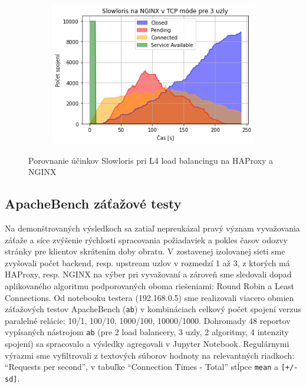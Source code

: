 \documentclass[12pt, a4paper]{article}
\begin{document}
\begin{figure}[h]
\begin{subfigure}[t]{.32\textwidth}
	\end{subfigure}
	\begin{subfigure}[t]{.32\textwidth}
  		\centering
  		\includegraphics[width=\textwidth]{images/nginx-3-tcp.png}
	\end{subfigure}
	\caption{Porovnanie účinkov Slowloris pri L4 load balancingu na HAProxy a NGINX}
\end{figure}

\subsection{ApacheBench záťažové testy}
Na demonštrovaných výsledkoch sa zatiaľ nepreukázal pravý význam vyvažovania záťaže a síce
zvýšenie rýchlosti spracovania požiadaviek a pokles časov odozvy stránky pre klientov 
skrátením doby obratu. V zostavenej izolovanej sieti sme zvyšovali počet backend, resp. upstream 
uzlov v rozmedzí 1 až 3, z ktorých má HAProxy, resp. NGINX na výber pri vyvažovaní a zároveň sme
sledovali dopad aplikovaného algoritmu podporovaných oboma riešeniami: Round Robin a Least Connections.
Od notebooku testera (192.168.0.5) sme realizovali viacero obmien záťažových testov ApacheBench 
(\verb|ab|) v kombináciach celkový počet spojení verzus paralelné relácie: 10/1, 100/10, 1000/100,
10000/1000. Dohromady 48 reportov vypísaných nástrojom \verb|ab| (pre 2 load balancery, 3 uzly, 2 algoritmy,
4 intenzity spojení) sa spracovalo a výsledky agregovali v Jupyter Notebook. Regulárnymi výrazmi sme
vyfiltrovali z textových súborov hodnoty na relevantných riadkoch: \enquote{Requests per second}, v tabuľke 
\enquote{Connection Times - Total} stĺpce \verb|mean| a \verb|[+/-sd]|.
\end{document}
